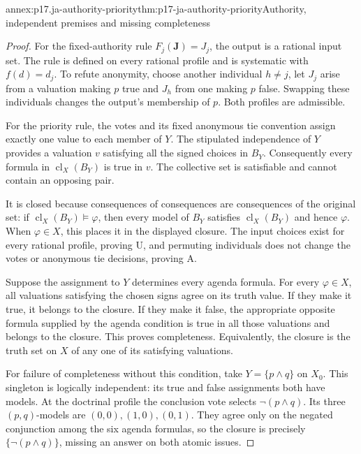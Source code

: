 \begin{annexitem}{annex:p17.ja-authority-priority}{thm:p17-ja-authority-priority}{Authority, independent premises and missing completeness}
\begin{proof}
For the fixed-authority rule \(F_j(\mathbf J)=J_j\), the output is a rational
input set. The rule is defined on every rational profile and is systematic
with \(f(d)=d_j\). To refute anonymity, choose another individual
\(h\ne j\), let \(J_j\) arise from a valuation making \(p\) true and
\(J_h\) from one making \(p\) false. Swapping these individuals changes
the output's membership of \(p\). Both profiles are admissible.

For the priority rule, the votes and its fixed anonymous tie convention assign
exactly one value to each member of \(Y\). The stipulated independence of
\(Y\) provides a valuation \(v\) satisfying all the signed choices in
\(B_Y\). Consequently every formula in \(\operatorname{cl}_X(B_Y)\) is
true in \(v\). The collective set is satisfiable and cannot contain an
opposing pair.

It is closed because consequences of consequences are consequences of the
original set: if \(\operatorname{cl}_X(B_Y)\models\varphi\), then every
model of \(B_Y\) satisfies \(\operatorname{cl}_X(B_Y)\) and hence
\(\varphi\). When \(\varphi\in X\), this places it in the displayed
closure. The input choices exist for every rational profile, proving U, and
permuting individuals does not change the votes or anonymous tie decisions,
proving A.

Suppose the assignment to \(Y\) determines every agenda formula. For every
\(\varphi\in X\), all valuations satisfying the chosen signs agree on its
truth value. If they make it true, it belongs to the closure. If they make it
false, the appropriate opposite formula supplied by the agenda condition is
true in all those valuations and belongs to the closure. This proves
completeness. Equivalently, the closure is the truth set on \(X\) of any one
of its satisfying valuations.

For failure of completeness without this condition, take \(Y=\{p\land q\}\)
on \(X_0\). This singleton is logically independent: its true and false
assignments both have models. At the doctrinal profile the conclusion vote
selects \(\neg(p\land q)\). Its three \((p,q)\)-models are
\((0,0),(1,0),(0,1)\). They agree only on the negated conjunction among
the six agenda formulas, so the closure is precisely
\(\{\neg(p\land q)\}\), missing an answer on both atomic issues.


\end{proof}
\end{annexitem}
